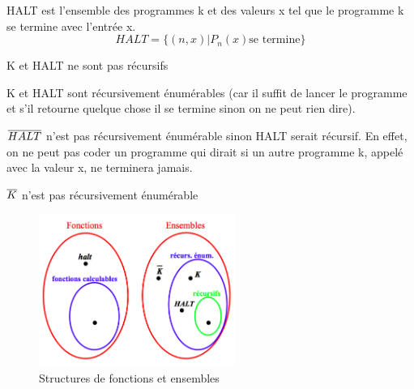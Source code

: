 \begin{mydef}[HALT]
	HALT est l'ensemble des programmes k et des valeurs x tel que le programme k se termine avec l'entrée x.
	\[ HALT = \{(n,x)|P_n(x)\text{se termine}\}\]
\end{mydef}

\begin{myprop}
	K et HALT ne sont pas récursifs
\end{myprop}

\begin{myprop}
	K et HALT sont récursivement énumérables (car il suffit de lancer le programme et s’il retourne quelque chose il se termine sinon on ne peut rien dire).
\end{myprop}

\begin{myprop}
	$\overline{HALT}$ n'est pas récursivement énumérable sinon HALT serait récursif.  En effet, on ne peut pas coder un programme qui dirait si un autre programme k, appelé avec la valeur x, ne terminera jamais.
\end{myprop}

\begin{myprop}
	$\overline{K}$ n'est pas récursivement énumérable
\end{myprop}

\begin{figure}[h]
  \centering
  \includegraphics[width=0.57\textwidth]{Images/Structures_de_fonctions_et_ensembles}
  \caption{ Structures de fonctions et ensembles}
  \label{rb}
\end{figure}


